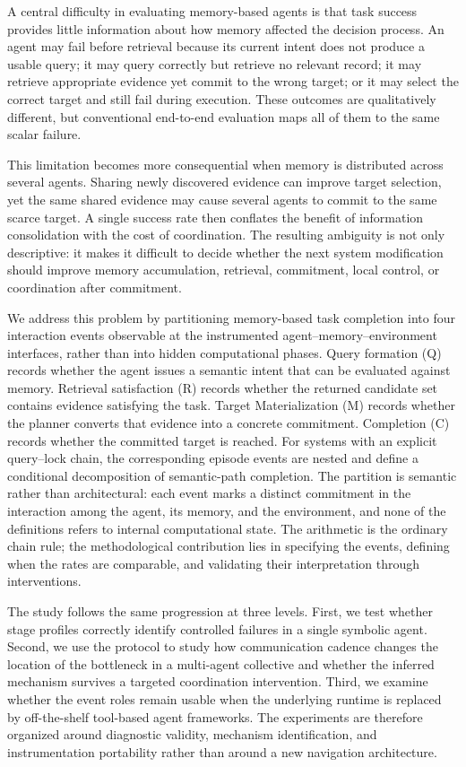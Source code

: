 \documentclass[letterpaper]{article} %
\begin{document}
A central difficulty in evaluating memory-based agents is that task success provides little information about how memory affected the decision process. An agent may fail before retrieval because its current intent does not produce a usable query; it may query correctly but retrieve no relevant record; it may retrieve appropriate evidence yet commit to the wrong target; or it may select the correct target and still fail during execution. These outcomes are qualitatively different, but conventional end-to-end evaluation maps all of them to the same scalar failure.

This limitation becomes more consequential when memory is distributed across several agents. Sharing newly discovered evidence can improve target selection, yet the same shared evidence may cause several agents to commit to the same scarce target. A single success rate then conflates the benefit of information consolidation with the cost of coordination. The resulting ambiguity is not only descriptive: it makes it difficult to decide whether the next system modification should improve memory accumulation, retrieval, commitment, local control, or coordination after commitment.

We address this problem by partitioning memory-based task completion into four interaction events observable at the instrumented agent--memory--environment interfaces, rather than into hidden computational phases. Query formation (Q) records whether the agent issues a semantic intent that can be evaluated against memory. Retrieval satisfaction (R) records whether the returned candidate set contains evidence satisfying the task. Target Materialization (M) records whether the planner converts that evidence into a concrete commitment. Completion (C) records whether the committed target is reached. For systems with an explicit query--lock chain, the corresponding episode events are nested and define a conditional decomposition of semantic-path completion. The partition is semantic rather than architectural: each event marks a distinct commitment in the interaction among the agent, its memory, and the environment, and none of the definitions refers to internal computational state. The arithmetic is the ordinary chain rule; the methodological contribution lies in specifying the events, defining when the rates are comparable, and validating their interpretation through interventions.

The study follows the same progression at three levels. First, we test whether stage profiles correctly identify controlled failures in a single symbolic agent. Second, we use the protocol to study how communication cadence changes the location of the bottleneck in a multi-agent collective and whether the inferred mechanism survives a targeted coordination intervention. Third, we examine whether the event roles remain usable when the underlying runtime is replaced by off-the-shelf tool-based agent frameworks. The experiments are therefore organized around diagnostic validity, mechanism identification, and instrumentation portability rather than around a new navigation architecture.
\end{document}
